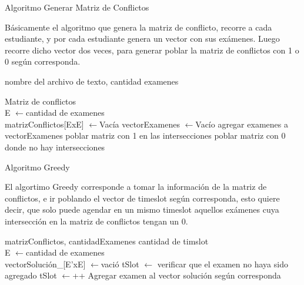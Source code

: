 \begin{algorithm}[H]  
  \caption{Algoritmo Generar Matriz de Conflictos}  
  \label{alg:Framwork}  
  Básicamente el algoritmo que genera la matriz de conflicto, recorre a cada estudiante, y por cada estudiante genera un vector con sus exámenes. Luego recorre dicho vector dos veces, para generar poblar la matriz de conflictos con 1 o 0 según corresponda.
  \begin{algorithmic}  
    \Require  
    nombre del archivo de texto, cantidad examenes
    
    \Ensure  
   Matriz de conflictos \\
   E $\leftarrow $\;cantidad de examenes\\
   matrizConflictos{[ExE]} $\leftarrow$\;Vacía
        \State vectorExamenes $\leftarrow $\;Vacío
                \State agregar examenes a vectorExamenes
            \EndIf
                    \State poblar matriz con 1 en las intersecciones
                    \State poblar matriz con 0 donde no hay intersecciones
                \EndFor
            \EndIf
        \EndFor  
    \EndWhile
  \end{algorithmic}  
\end{algorithm}

\begin{algorithm}[H]  
  \caption{Algoritmo Greedy}  
  El algortimo Greedy corresponde a tomar la información de la matriz de conflictos, e ir poblando el vector de timeslot según corresponda, esto quiere decir, que solo puede agendar en un mismo timeslot aquellos exámenes cuya intersección en la matriz de conflictos tengan un 0.
  \label{alg:Framwork}  
  \begin{algorithmic}  
    \Require  
    matrizConflictos, cantidadExamenes
    \Ensure  
   cantidad de timslot\\
   E $\leftarrow $\;cantidad de examenes\\
   vectorSolución_{[E'xE]} $\leftarrow $\;vació
   \State tSlot $\leftarrow $
            \State verificar que el examen no haya sido agregado
                \State tSlot $\leftarrow $\;++
            \EndIf
            \State Agregar examen al vector solución según corresponda
        \EndFor
    \EndFor
   
  \end{algorithmic}  
\end{algorithm}

